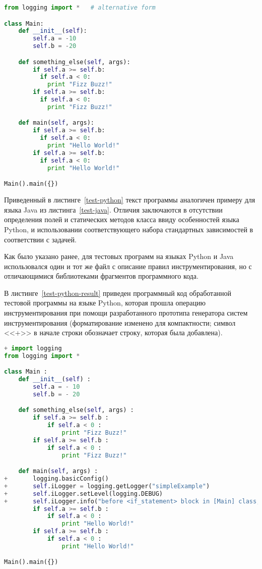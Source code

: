 \begin{lstlisting}[frame=single, language=Python, label={test-python}, caption={Исходный текст тестового приложения.}]
from logging import *   # alternative form

class Main:
    def __init__(self):
        self.a = -10
        self.b = -20

    def something_else(self, args):
        if self.a >= self.b:
          if self.a < 0:
            print "Fizz Buzz!"
        if self.a >= self.b:
          if self.a < 0:
            print "Fizz Buzz!"

    def main(self, args):
        if self.a >= self.b:
          if self.a < 0:
            print "Hello World!"
        if self.a >= self.b:
          if self.a < 0:
            print "Hello World!"

Main().main({})
\end{lstlisting}

Приведенный в листинге~\ref{test-python} текст программы аналогичен примеру для языка Java из листинга~\ref{test-java}.
Отличия заключаются в отсутствии определения полей и статических методов класса ввиду особенностей языка Python, и использовании соответствующего набора стандартных зависимостей в соответствии с задачей.

Как было указано ранее, для тестовых программ на языках Python и Java использовался один и тот же файл с описание правил инструментирования, но с отличающимися библиотеками фрагментов программного кода.

В листинге~\ref{test-python-result} приведен программный код обработанной тестовой программы на языке Python, которая прошла операцию инструментирования при помощи разработанного прототипа генератора систем инструментирования (форматирование изменено для компактности; символ <<+>> в начале строки обозначает строку, которая была добавлена).

\begin{lstlisting}[frame=single, language=Python, label={test-python-result}, caption={Текст инструментированного тестового приложения.}]
+ import logging
from logging import *

class Main :
    def __init__(self) :
        self.a = - 10
        self.b = - 20

    def something_else(self, args) :
        if self.a >= self.b :
            if self.a < 0 :
                print "Fizz Buzz!"
        if self.a >= self.b :
            if self.a < 0 :
                print "Fizz Buzz!"

    def main(self, args) :
+       logging.basicConfig()
+       self.iLogger = logging.getLogger("simpleExample")
+       self.iLogger.setLevel(logging.DEBUG)
+       self.iLogger.info("before <if_statement> block in [Main] class, in {main} method")
        if self.a >= self.b :
            if self.a < 0 :
                print "Hello World!"
        if self.a >= self.b :
            if self.a < 0 :
                print "Hello World!"

Main().main({})
\end{lstlisting}

